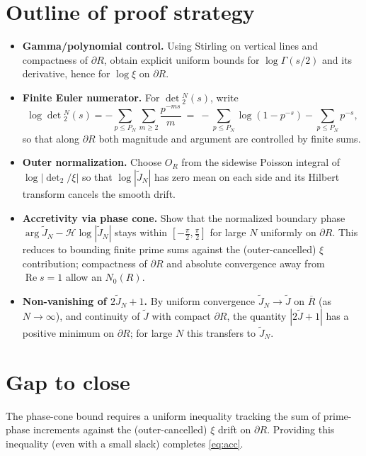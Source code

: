 \documentclass[11pt]{article}
\theoremstyle{remark}
\newcommand{\ReS}{\operatorname{Re}}
\begin{document}
\section*{Outline of proof strategy}
\begin{itemize}
  \item \textbf{Gamma/polynomial control.} Using Stirling on vertical lines and compactness of $\partial R$, obtain explicit uniform bounds for $\log\Gamma(s/2)$ and its derivative, hence for $\log\xi$ on $\partial R$.
  \item \textbf{Finite Euler numerator.} For $\det{}_2^N(s)$, write
  \[\log\det{}_2^N(s)= -\sum_{p\le P_N}\sum_{m\ge2} \frac{p^{-ms}}{m}\ =\ -\sum_{p\le P_N} \log(1-p^{-s}) - \sum_{p\le P_N} p^{-s},\]
  so that along $\partial R$ both magnitude and argument are controlled by finite sums.
  \item \textbf{Outer normalization.} Choose $O_R$ from the sidewise Poisson integral of $\log|\det_2/\xi|$ so that $\log|\widetilde J_N|$ has zero mean on each side and its Hilbert transform cancels the smooth drift.
  \item \textbf{Accretivity via phase cone.} Show that the normalized boundary phase $\arg \widetilde J_N - \mathcal H\log|\widetilde J_N|$ stays within $[-\tfrac\pi2,\tfrac\pi2]$ for large $N$ uniformly on $\partial R$. This reduces to bounding finite prime sums against the (outer-cancelled) $\xi$ contribution; compactness of $\partial R$ and absolute convergence away from $\ReS s=1$ allow an $N_0(R)$.
  \item \textbf{Non-vanishing of $2\widetilde J_N+1$.} By uniform convergence $\widetilde J_N\to \widetilde J$ on $\overline R$ (as $N\to\infty$), and continuity of $\widetilde J$ with compact $\partial R$, the quantity $|2\widetilde J+1|$ has a positive minimum on $\partial R$; for large $N$ this transfers to $\widetilde J_N$.
\end{itemize}

\section*{Gap to close}
The phase-cone bound requires a uniform inequality tracking the sum of prime-phase increments against the (outer-cancelled) $\xi$ drift on $\partial R$. Providing this inequality (even with a small slack) completes \eqref{eq:acc}.
\end{document}
